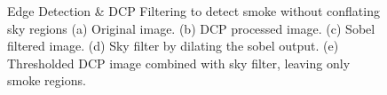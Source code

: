 \documentclass[lettersize,journal]{IEEEtran}
\begin{document}
\begin{figure}
        \centering
        \hfil
        \hfil
        \hfil
        \hfil
        \caption{Edge Detection \& DCP Filtering to detect smoke without
        conflating sky regions (a) Original image. (b) DCP processed image. (c) Sobel filtered image. (d) Sky filter by dilating the sobel output. (e) Thresholded DCP image combined with sky filter, leaving only smoke regions.}
        \label{edgedcp}
\end{figure}





\newpage


\vfill
\end{document}
